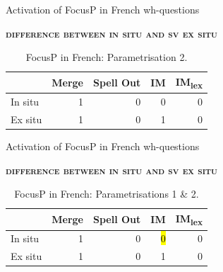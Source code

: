 \documentclass[lesson_slides]{subfiles}
\begin{document}
\begin{frame}{Activation of FocusP in French wh-questions}

    \noindent \textbf{\textsc{difference between in situ and sv ex situ}} \pause
    \vspace*{2mm}
    \begin{table}[H]
    \centering
        \begin{tabular}{|l|r|r|r|r|}
        \hline
         & Merge & Spell Out & IM & IM\textsubscript{lex} \\
         \hline
        In situ & 1 & 0 & 0 & 0 \\
        \hline
        Ex situ & 1 & 0 & 1 & 0 \\
        \hline
        \end{tabular}
    \caption{\label{tab:samp}FocusP in French: Parametrisation 2.}
    \end{table}
    
    
\end{frame}
\begin{frame}{Activation of FocusP in French wh-questions}

    \noindent \textbf{\textsc{difference between in situ and sv ex situ}}
    \vspace*{2mm}
    \begin{table}[H]
    \centering
        \begin{tabular}{|l|r|r|r|r|}
        \hline
         & Merge & Spell Out & IM & IM\textsubscript{lex} \\
         \hline
        In situ & 1 & 0 & \hl{0} & 0 \\
        \hline
        Ex situ & 1 & 0 & 1 & 0 \\
        \hline
        \end{tabular}
    \caption{\label{tab:samp}FocusP in French: Parametrisations 1 \& 2.}
    \end{table}
    
    
\end{frame}
\end{document}
